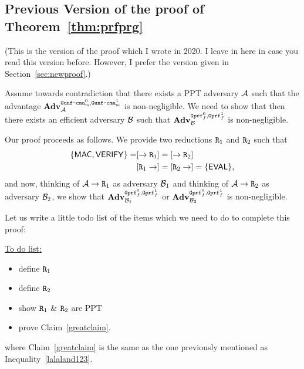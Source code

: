 \documentclass[a4paper,table,dvipsnames]{article}
\theoremstyle{definition}
\newcommand{\M}[1]{\ensuremath{\text{\texttt{#1}}}}
\renewcommand{\O}[1]{\ensuremath{\mathsf{#1}}}
\newcommand{\pcvar}[1]{\ensuremath{\mathit{#1}}}
\newcommand{\m}{\pcvar{m}} %
\begin{document}
\iffalse
\subsection{Previous Version of the proof of Theorem~\ref{thm:prfprg}}
(This is the version of the proof which I wrote in 2020. I leave in here in case you read this
version before. However, I prefer the version given in Section~\ref{sec:newproof}.)

Assume towards contradiction that there exists a PPT adversary $\mathcal{A}$ such that
the advantage
$\mathbf{Adv}_{\adv}^{
  \M{Gunf\text{-}cma}^0_\m,
  \M{Gunf\text{-}cma}^1_\m}$ is non-negligible. We need to show that then there
	exists an efficient adversary $\mathcal{B}$ such that $\mathbf{Adv}_{\bdv}^{
  \M{Gprf}^0_f,
  \M{Gprf}^1_f}$ is non-negligible.

Our proof proceeds as follows. We provide two reductions $\M{R}_1$
and $\M{R}_2$ such that
\begin{align*}
\{\O{MAC},\O{VERIFY}\}=
&
[\rightarrow \M{R}_1]=[\rightarrow \M{R}_2] \\
&[\M{R}_1\rightarrow]=
[\M{R}_2\rightarrow]=\{\O{EVAL}\},
\end{align*}
and now, thinking of $\adv\rightarrow\M{R}_1$ as adversary $\mathcal{B}_1$ and thinking of 
$\adv\rightarrow\M{R}_2$ as adversary $\mathcal{B}_2$, we show that 
$\mathbf{Adv}_{\bdv_1}^{
  \M{Gprf}^0_f,
  \M{Gprf}^1_f}$ or $\mathbf{Adv}_{\bdv_2}^{
  \M{Gprf}^0_f,
  \M{Gprf}^1_f}$ is non-negligible. 
	
	Let us write a little todo list of
	the items which we need to do to complete this proof:
	
	\underline{\underline{To do list:}}
	\begin{itemize}
	\item define $\M{R}_1$
	\item define $\M{R}_2$
  \item show $\M{R}_1$ \& $\M{R}_2$ are PPT
	\item prove Claim~\ref{greatclaim}.
	\end{itemize}
where Claim~\ref{greatclaim} is the same as the one previously mentioned as Inequality~\ref{lalaland123}.
\end{document}
